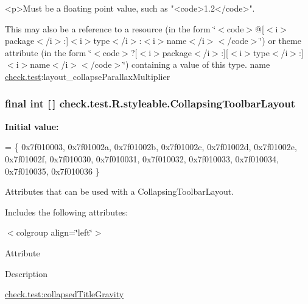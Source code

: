 \begin{DoxyVerb}      <p>Must be a floating point value, such as "<code>1.2</code>".
\end{DoxyVerb}
 

This may also be a reference to a resource (in the form \char`\"{}$<$code$>$@\mbox{[}$<$i$>$package$<$/i$>$\+:\mbox{]}$<$i$>$type$<$/i$>$\+:$<$i$>$name$<$/i$>$$<$/code$>$\char`\"{}) or theme attribute (in the form \char`\"{}$<$code$>$?\mbox{[}$<$i$>$package$<$/i$>$\+:\mbox{]}\mbox{[}$<$i$>$type$<$/i$>$\+:\mbox{]}$<$i$>$name$<$/i$>$$<$/code$>$\char`\"{}) containing a value of this type.  name \hyperlink{namespacecheck_1_1test}{check.\+test}\+:layout\+\_\+collapse\+Parallax\+Multiplier \hypertarget{classcheck_1_1test_1_1_r_1_1styleable_a0c512120c75d0ddac20063034a72db17}{}
\subsubsection[{Collapsing\+Toolbar\+Layout}]{\setlength{\rightskip}{0pt plus 5cm}final int \mbox{[}$\,$\mbox{]} check.\+test.\+R.\+styleable.\+Collapsing\+Toolbar\+Layout\hspace{0.3cm}{\ttfamily [static]}}\label{classcheck_1_1test_1_1_r_1_1styleable_a0c512120c75d0ddac20063034a72db17}
{\bfseries Initial value\+:}
\begin{DoxyCode}
= \{
            0x7f010003, 0x7f01002a, 0x7f01002b, 0x7f01002c,
            0x7f01002d, 0x7f01002e, 0x7f01002f, 0x7f010030,
            0x7f010031, 0x7f010032, 0x7f010033, 0x7f010034,
            0x7f010035, 0x7f010036
        \}
\end{DoxyCode}
Attributes that can be used with a Collapsing\+Toolbar\+Layout. 

Includes the following attributes\+:

\begin{TabularC}{0}
\hline
\end{TabularC}
$<$colgroup align=\char`\"{}left\char`\"{}$>$ 

Attribute

Description 

{\ttfamily \hyperlink{classcheck_1_1test_1_1_r_1_1styleable_ad728b1cdc0cf8cb71ec337342515dd75}{check.\+test\+:collapsed\+Title\+Gravity}}

